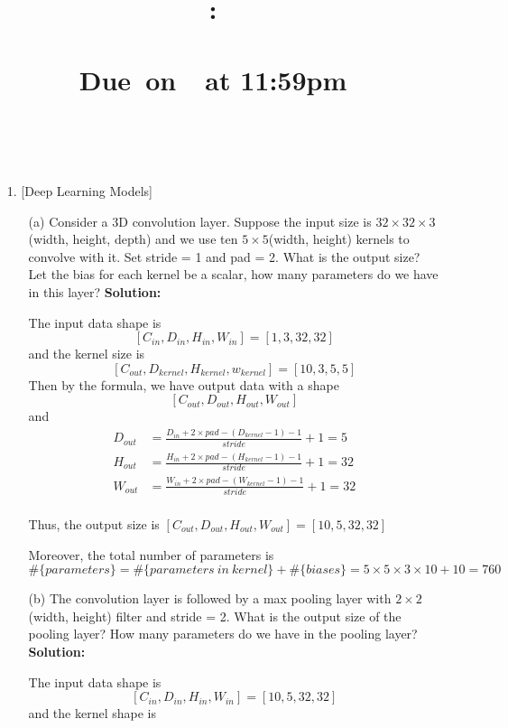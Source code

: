 \documentclass{article}
\title{
    \vspace{2in}
    \textmd{\textbf{\hmwkClass:\\ \hmwkTitle}}\\
    \normalsize\vspace{0.1in}\small{Due\ on\ \hmwkDueDate\ at 11:59pm}\\
    \vspace{0.1in}\large{\textit{\hmwkClassInstructor}}
    \vspace{3in}
}
\author{\textbf{\hmwkAuthorName}\\ \hmwkAuthorID}
\date{}
\begin{document}
\maketitle
\pagebreak

\begin{enumerate}
	\setlength\parindent{2em}
    \item [1.] [{Deep Learning Models}]
    \begin{enumerate}
	    \setlength\parindent{2em}
        \item [(a)] Consider a 3D convolution layer. Suppose the input size is $32 \times 32 \times 3$ (width, height, depth) and we use ten $5 \times 5$(width, height) kernels to convolve with it. Set stride = 1 and pad = 2. What is the output size? Let the bias for each kernel be a scalar, how many parameters do we have in this layer?\newline
        {\bf Solution:}
        \par The input data shape is \[[C_{in},D_{in},H_{in},W_{in}] = [1, 3, 32, 32]\] and the kernel size is \[[C_{out}, D_{kernel}, H_{kernel}, w_{kernel}] = [10, 3, 5, 5]\]
        Then by the formula, we have output data with a shape
        \[[C_{out}, D_{out}, H_{out}, W_{out}]\]
        and 
        \begin{align*}
                D_{out} &= \frac{D_{in}+2\times pad-(D_{kernel}-1)-1}{stride}+1=5\\
                H_{out} &= \frac{H_{in}+2\times pad-(H_{kernel}-1)-1}{stride}+1=32\\
                W_{out} &= \frac{W_{in}+2\times pad-(W_{kernel}-1)-1}{stride}+1=32\\
        \end{align*}
        \par Thus, the output size is $[C_{out}, D_{out}, H_{out}, W_{out}]=[10,5,32,32]$
        \par Moreover, the total number of parameters is 
        \[\#\{parameters\}=\#\{parameters\ in\ kernel\}+\#\{biases\} = 5\times 5\times 3\times 10 + 10=760\]
        \item [(b)] The convolution layer is followed by a max pooling layer with $2 \times 2$ (width, height) filter and stride = 2. What is the output size of the pooling layer? How many parameters do we have in the pooling layer?\newline
        {\bf Solution:}
        \par The input data shape is 
        \[[C_{in}, D_{in}, H_{in}, W_{in}]=[10,5,32,32]\]
        and the kernel shape is 

\end{enumerate}
\end{enumerate}
\end{document}
